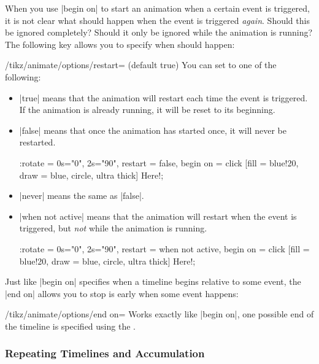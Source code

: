 When you use |begin on| to start an animation when a certain event is
triggered, it is not clear what should happen when the event is
triggered \emph{again}. Should this be ignored completely? Should it
only be ignored while the animation is running? The following key
allows you to specify when should happen:

\begin{key}{/tikz/animate/options/restart= (default true)}
  You can set  to one of the following:
  \begin{itemize}
  \item |true| means that the animation will restart each time the
    event is triggered. If the animation is already running, it will
    be reset to its beginning.
  \item |false| means that once the animation has started once, it
    will never be restarted.
\begin{codeexample}[width=2cm]
\tikz \node :rotate = { 0s="0", 2s="90",
                        restart = false, begin on = {click}}
    [fill = blue!20, draw = blue, circle, ultra thick] {Here!}; 
\end{codeexample}  
  \item |never| means the same as |false|.
  \item |when not active| means that the animation will restart when
    the event is triggered, but \emph{not} while the animation is
    running.     
\begin{codeexample}[width=2cm]
\tikz \node :rotate = { 0s="0", 2s="90",
                        restart = when not active, begin on = {click}}
    [fill = blue!20, draw = blue, circle, ultra thick] {Here!}; 
\end{codeexample}  
  \end{itemize}
\end{key}

Just like |begin on| specifies when a timeline begins relative to some
event, the |end on| allows you to stop is early when some event
happens:

\begin{key}{/tikz/animate/options/end on=}
  Works exactly like |begin on|, one possible end of the timeline is
  specified using the .
\end{key}


\subsubsection{Repeating Timelines and Accumulation}

